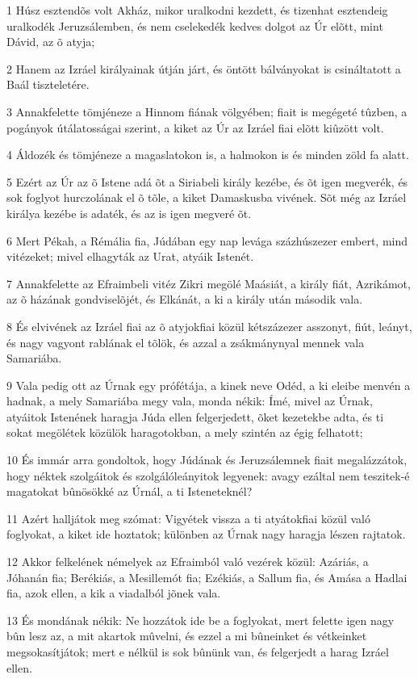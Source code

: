 \par 1 Húsz esztendõs volt Akház, mikor uralkodni kezdett, és tizenhat esztendeig uralkodék Jeruzsálemben, és nem cselekedék kedves dolgot az Úr elõtt, mint Dávid, az õ atyja;
\par 2 Hanem az Izráel királyainak útján járt, és öntött bálványokat is csináltatott a Baál tiszteletére.
\par 3 Annakfelette tömjéneze a Hinnom fiának völgyében; fiait is megégeté tûzben, a pogányok útálatosságai szerint, a kiket az Úr az Izráel fiai elõtt kiûzött volt.
\par 4 Áldozék és tömjéneze a magaslatokon is, a halmokon is és minden zöld fa alatt.
\par 5 Ezért az Úr az õ Istene adá õt a Siriabeli király kezébe, és õt igen megverék, és sok foglyot hurczolának el õ tõle, a kiket Damaskusba vivének. Sõt még az Izráel királya kezébe is adaték, és az is igen megveré õt.
\par 6 Mert Pékah, a Rémália fia, Júdában egy nap levága százhúszezer embert, mind vitézeket; mivel elhagyták az Urat, atyáik Istenét.
\par 7 Annakfelette az Efraimbeli vitéz Zikri megölé Maásiát, a király fiát, Azrikámot, az õ házának gondviselõjét, és Elkánát, a ki a király után második vala.
\par 8 És elvivének az Izráel fiai az õ atyjokfiai közül kétszázezer asszonyt, fiút, leányt, és nagy vagyont rablának el tõlök, és azzal a zsákmánynyal mennek vala Samariába.
\par 9 Vala pedig ott az Úrnak egy prófétája, a kinek neve Odéd, a ki eleibe menvén a hadnak, a mely Samariába megy vala, monda nékik: Ímé, mivel az Úrnak, atyáitok Istenének haragja Júda ellen felgerjedett, õket kezetekbe adta, és ti sokat megölétek közülök haragotokban, a mely szintén az égig felhatott;
\par 10 És immár arra gondoltok, hogy Júdának és Jeruzsálemnek fiait megalázzátok, hogy néktek szolgáitok és szolgálóleányitok legyenek: avagy ezáltal nem teszitek-é magatokat bûnösökké az Úrnál, a ti Isteneteknél?
\par 11 Azért halljátok meg szómat: Vigyétek vissza a ti atyátokfiai közül való foglyokat, a kiket ide hoztatok; különben az Úrnak nagy haragja lészen rajtatok.
\par 12 Akkor felkelének némelyek az Efraimból való vezérek közül: Azáriás, a Jóhanán fia; Berékiás, a Mesillemót fia; Ezékiás, a Sallum fia, és Amása a Hadlai fia, azok ellen, a kik a viadalból jõnek vala.
\par 13 És mondának nékik: Ne hozzátok ide be a foglyokat, mert felette igen nagy bûn lesz az, a mit akartok mûvelni, és ezzel a mi bûneinket és vétkeinket megsokasítjátok; mert e nélkül is sok bûnünk van, és felgerjedt a harag Izráel ellen.
